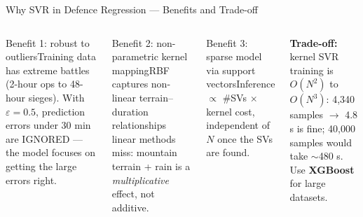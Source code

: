 \documentclass[aspectratio=169,10pt,t]{beamer}
\begin{document}
\begin{frame}{Why SVR in Defence Regression --- Benefits and Trade-off}
\begin{columns}[T]
\begin{cbox}[ISSAgrn]{Benefit 1: robust to outliers}\scriptsize Training data has extreme battles (2-hour ops to 48-hour sieges). With $\varepsilon=0.5$, prediction errors under 30 min are IGNORED --- the model focuses on getting the large errors right.\end{cbox}
\begin{cbox}[ISSAgrn]{Benefit 2: non-parametric kernel mapping}\scriptsize RBF captures non-linear terrain--duration relationships linear methods miss: mountain terrain + rain is a \emph{multiplicative} effect, not additive.\end{cbox}
\begin{cbox}[ISSAgrn]{Benefit 3: sparse model via support vectors}\scriptsize Inference $\propto$ \#SVs $\times$ kernel cost, independent of $N$ once the SVs are found.\end{cbox}
\begin{wbox}\scriptsize\textbf{Trade-off:} kernel SVR training is $O(N^2)$ to $O(N^3)$: 4,340 samples $\to$ 4.8 s is fine; 40,000 samples would take $\sim$480 s. Use \textbf{XGBoost} for large datasets.\end{wbox}
\end{columns}
\end{frame}
\end{document}

